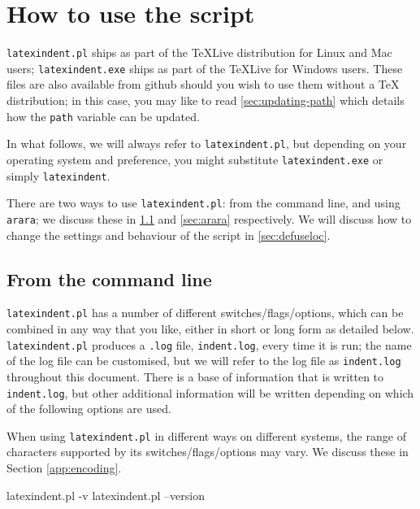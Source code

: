 \section{How to use the script}\label{sec:how:to:use}
 \texttt{latexindent.pl} ships as part of the \TeX Live distribution for
 Linux and Mac users; \texttt{latexindent.exe} ships as part of the \TeX Live for Windows
 users. These files are also available from github \cite{latexindent-home} should you wish
 to use them without a \TeX{} distribution; in this case, you may like to read
 \vref{sec:updating-path} which details how the \texttt{path} variable can be updated.

 In what follows, we will always refer to \texttt{latexindent.pl}, but depending on your
 operating system and preference, you might substitute \texttt{latexindent.exe} or simply
 \texttt{latexindent}.

 There are two ways to use \texttt{latexindent.pl}: from the command line, and using
 \texttt{arara}; we discuss these in \cref{sec:commandline} and \cref{sec:arara}
 respectively. We will discuss how to change the settings and behaviour of the script in
 \vref{sec:defuseloc}.

\subsection{From the command line}\label{sec:commandline}
 \texttt{latexindent.pl} has a number of different switches/flags/options, which
 can be combined in any way that you like, either in short or long form as detailed below.
 \texttt{latexindent.pl} produces a \texttt{.log} file, \texttt{indent.log}, every time it
 is run; the name of the log file can be customised, but we will refer to the log file as
 \texttt{indent.log} throughout this document. There is a base of information that is
 written to \texttt{indent.log}, but other additional information will be written
 depending on which of the following options are used.

 When using \texttt{latexindent.pl} in different ways on different systems, the range of
 characters supported by its switches/flags/options may vary. We discuss these in Section
 \cref{app:encoding}.


 \begin{commandshell}
latexindent.pl -v
latexindent.pl --version
\end{commandshell}

